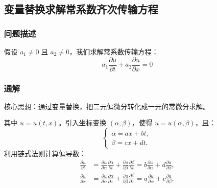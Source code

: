 \documentclass[12pt,a4paper]{article}
\numberwithin{subsection}{section}
\numberwithin{subsubsection}{subsection}
\theoremstyle{plain}
\theoremstyle{definition}
\theoremstyle{remark}
\begin{document}
	\subsection{变量替换求解常系数齐次传输方程} 
	\subsubsection{问题描述}
	
	
	假设 $a_1 \neq 0$ 且 $a_2 \neq 0$，我们求解常系数传输方程：
	\begin{equation} \label{eq:pde_original}
		a_1 \frac{\partial u}{\partial t} + a_2 \frac{\partial u}{\partial x} = 0
	\end{equation}
	
	\subsubsection{通解} 
	核心思想：通过变量替换，把二元偏微分转化成一元的常微分求解。
	
	其中 $u = u(t,x)$。引入坐标变换 $(\alpha, \beta)$，使得 $u = u(\alpha, \beta)$，且：
	\begin{equation} \label{eq:coordinate_transform}
		\begin{cases}
			\alpha = ax + bt, \\
			\beta = cx + dt.
		\end{cases}
	\end{equation}
	利用链式法则计算偏导数：
	\begin{align}
		\frac{\partial u}{\partial t} 
		&= \frac{\partial u}{\partial \alpha} \frac{\partial \alpha}{\partial t} + \frac{\partial u}{\partial \beta} \frac{\partial \beta}{\partial t} 
		= b\frac{\partial u}{\partial \alpha} + d\frac{\partial u}{\partial \beta}, \label{eq:u_t_chain_rule} \\
		\frac{\partial u}{\partial x} 
		&= \frac{\partial u}{\partial \alpha} \frac{\partial \alpha}{\partial x} + \frac{\partial u}{\partial \beta} \frac{\partial \beta}{\partial x} 
		= a\frac{\partial u}{\partial \alpha} + c\frac{\partial u}{\partial \beta}. \label{eq:u_x_chain_rule}
	\end{align}
	
\end{document}
